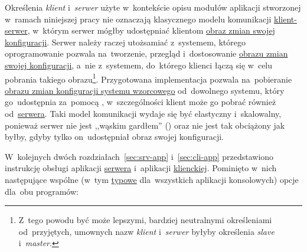 \documentclass[thesis]{subfiles}
\begin{document}
Określenia \emph{klient} i~\emph{serwer} użyte w~kontekście opisu modułów aplikacji stworzonej w~ramach niniejszej pracy nie oznaczają klasycznego modelu komunikacji \href{https://en.wikipedia.org/wiki/Client\%E2\%80\%93server\_model}{klient-serwer}, w~którym serwer mógłby udostępniać klientom \hyperref[sec:obraz-zmian-konfiguracji]{obraz zmian swojej konfiguracji}. Serwer należy raczej utożsamiać z~systemem, którego oprogramowanie pozwala na~tworzenie, przegląd i~dostosowanie \hyperref[sec:obraz-zmian-konfiguracji]{obrazu zmian swojej konfiguracji}, a~nie z~systemem, do~którego klienci łączą się w~celu pobrania takiego obrazu\footnote{Z~tego powodu być może lepszymi, bardziej neutralnymi określeniami od~przyjętych, umownych nazw \emph{klient} i~\emph{serwer} byłyby określenia \emph{slave} i~\emph{master}.}. Przygotowana implementacja pozwala na~pobieranie \hyperref[sec:obraz-zmian-konfiguracji]{obrazu zmian konfiguracji systemu wzorcowego} od~dowolnego systemu, który go~udostępnia za~pomocą \sftp{}, w~szczególności klient może go pobrać również od~\hyperref[sec:srv-app]{serwera}. Taki model komunikacji wydaje się być elastyczny i~skalowalny, ponieważ serwer nie jest ,,wąskim gardłem'' () oraz nie jest tak obciążony jak byłby, gdyby tylko on~udostępniał obraz swojej konfiguracji.

W~kolejnych dwóch rozdziałach~\ref{sec:srv-app} i~\ref{sec:cli-app} przedstawiono instrukcję obsługi aplikacji \hyperref[sec:srv-app]{serwera} i~aplikacji \hyperref[sec:cli-app]{klienckiej}. Pominięto w~nich następujące wspólne (w~tym \href{https://www.gnu.org/prep/standards/html_node/Command_002dLine-Interfaces.html}{typowe} dla~wszystkich aplikacji konsolowych) opcje dla~obu programów:
\end{document}
